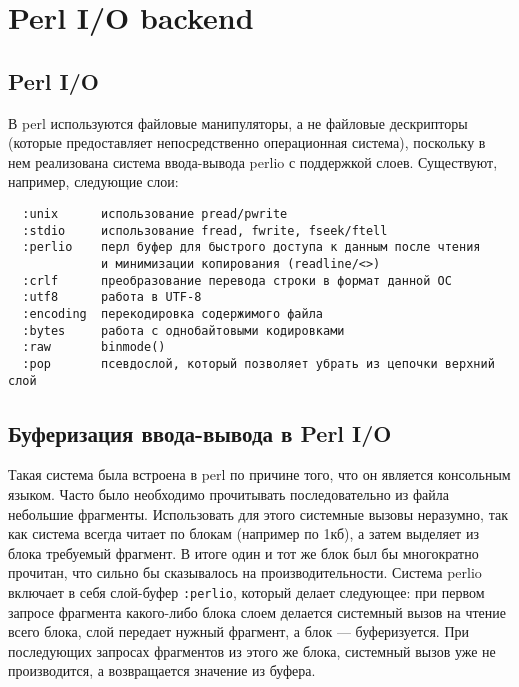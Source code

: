 \section{Perl I/O backend} %
\subsection{Perl I/O}
В perl используются файловые манипуляторы, а не файловые дескрипторы (которые предоставляет непосредственно операционная система), поскольку в нем реализована система ввода-вывода perlio с поддержкой слоев.
Существуют, например, следующие слои:
\begin{verbatim}
  :unix      использование pread/pwrite
  :stdio     использование fread, fwrite, fseek/ftell
  :perlio    перл буфер для быстрого доступа к данным после чтения
             и минимизации копирования (readline/<>)
  :crlf      преобразование перевода строки в формат данной ОС
  :utf8      работа в UTF-8
  :encoding  перекодировка содержимого файла
  :bytes     работа с однобайтовыми кодировками
  :raw       binmode()
  :pop       псевдослой, который позволяет убрать из цепочки верхний слой
\end{verbatim}


\subsection{Буферизация ввода-вывода в Perl I/O}
Такая система была встроена в perl по причине того, что он является консольным языком. Часто было необходимо прочитывать последовательно из файла небольшие фрагменты. Использовать для этого системные вызовы неразумно, так как система всегда читает по блокам (например по 1кб), а затем выделяет из блока требуемый фрагмент. В итоге один и тот же блок был бы многократно прочитан, что сильно бы сказывалось на производительности. Система perlio включает в себя слой-буфер \verb|:perlio|, который делает следующее: при первом запросе фрагмента какого-либо блока слоем делается системный вызов на чтение всего блока, слой передает нужный фрагмент, а блок --- буферизуется. При последующих запросах фрагментов из этого же блока, системный вызов уже не производится, а возвращается значение из буфера.

